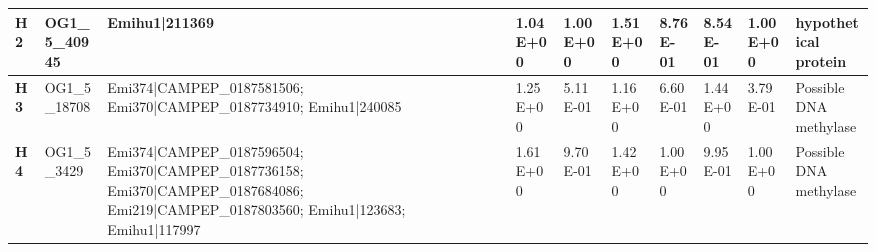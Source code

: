 \begin{landscape}
\begin{center}
\begin{footnotesize}
\begin{longtable}{|p{0.5cm}|p{1.5cm}|p{4cm}|l|l|l|l|l|l|l|}
\textbf{H2}  & OG1\_5\_40945 & Emihu1|211369                                                                                                                                                                                                                                                                                                                                                                                                                                                                                                                                                                                                                            & 1.04E+00  & 1.00E+00 & 1.51E+00  & 8.76E-01 & 8.54E-01  & 1.00E+00 & hypothetical protein                                                         \\ \hline
\textbf{H3}  & OG1\_5\_18708 & Emi374|CAMPEP\_0187581506; Emi370|CAMPEP\_0187734910; Emihu1|240085                                                                                                                                                                                                                                                                                                                                                                                                                                                                                                                                                                      & 1.25E+00  & 5.11E-01 & 1.16E+00  & 6.60E-01 & 1.44E+00  & 3.79E-01 & Possible DNA methylase                                                       \\ \hline
\textbf{H4}  & OG1\_5\_3429  & Emi374|CAMPEP\_0187596504; Emi370|CAMPEP\_0187736158; Emi370|CAMPEP\_0187684086; Emi219|CAMPEP\_0187803560; Emihu1|123683; Emihu1|117997                                                                                                                                                                                                                                                                                                                                                                                                                                                                                                 & 1.61E+00  & 9.70E-01 & 1.42E+00  & 1.00E+00 & 9.95E-01  & 1.00E+00 & Possible DNA methylase                                                       \\ \hline

\end{longtable}
\end{footnotesize}
\end{center}
\end{landscape}
